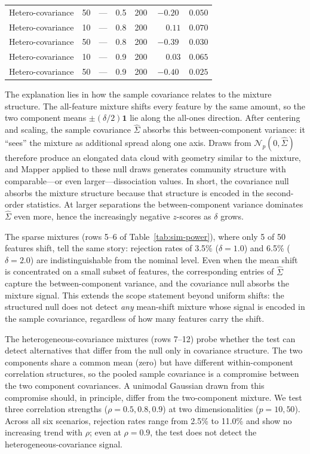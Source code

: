 \documentclass[hidelinks]{siamart251216}
\begin{document}
\begin{table}[t]
\begin{tabular}{@{}lcccccc@{}}
Hetero-covariance      & 50 & ---  & 0.5 & 200 & $-0.20$ & $0.050$ \\
Hetero-covariance      & 10 & ---  & 0.8 & 200 & $\phantom{-}0.11$ & $0.070$ \\
Hetero-covariance      & 50 & ---  & 0.8 & 200 & $-0.39$ & $0.030$ \\
Hetero-covariance      & 10 & ---  & 0.9 & 200 & $\phantom{-}0.03$ & $0.065$ \\
Hetero-covariance      & 50 & ---  & 0.9 & 200 & $-0.40$ & $0.025$ \\
\bottomrule
\end{tabular}
\end{table}

The explanation lies in how the sample covariance relates to the
mixture structure.  The all-feature mixture shifts every feature by the same
amount, so the two component means $\pm(\delta/2)\mathbf{1}$ lie along
the all-ones direction.  After centering and scaling, the sample
covariance $\hat\Sigma$ absorbs this between-component variance: it
``sees'' the mixture as additional spread along one axis.  Draws from
$\mathcal{N}_p(0, \hat\Sigma)$ therefore produce an elongated data
cloud with geometry similar to the mixture, and Mapper applied to
these null draws generates community structure with comparable---or
even larger---dissociation values.  In short, the covariance null
absorbs the mixture structure because that structure is encoded in the
second-order statistics.  At larger separations the between-component
variance dominates $\hat\Sigma$ even more, hence the increasingly
negative $z$-scores as $\delta$ grows.

The sparse mixtures (rows 5--6 of Table~\ref{tab:sim-power}),
where only 5 of 50 features shift, tell the same story: rejection
rates of 3.5\% ($\delta = 1.0$) and 6.5\% ($\delta = 2.0$) are
indistinguishable from the nominal level.  Even when the mean shift is
concentrated on a small subset of features, the corresponding entries of
$\hat\Sigma$ capture the between-component variance, and the covariance
null absorbs the mixture signal.  This extends the scope statement
beyond uniform shifts: the structured null does not detect \emph{any}
mean-shift mixture whose signal is encoded in the sample covariance,
regardless of how many features carry the shift.

The heterogeneous-covariance mixtures (rows 7--12) probe whether the
test can detect alternatives that differ from the null only in
covariance structure.  The two components share a common mean (zero) but
have different within-component correlation structures, so the pooled
sample covariance is a compromise between the two component covariances.
A unimodal Gaussian drawn from this compromise should, in principle,
differ from the two-component mixture.  We test three correlation strengths
($\rho = 0.5, 0.8, 0.9$) at two dimensionalities ($p = 10, 50$).
Across all six scenarios, rejection rates range from 2.5\% to 11.0\%
and show no increasing trend with $\rho$; even at $\rho = 0.9$, the
test does not detect the heterogeneous-covariance signal.
\end{document}
